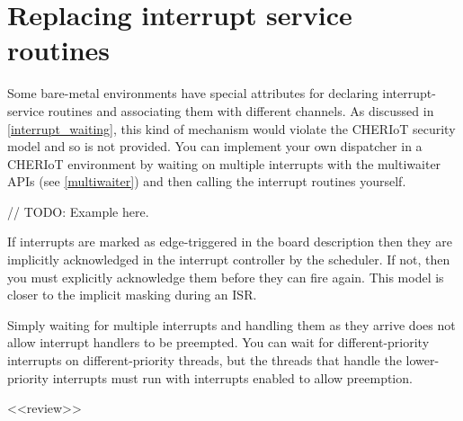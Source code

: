 \section{Replacing interrupt service routines}

Some bare-metal environments have special attributes for declaring interrupt-service routines and associating them with different channels.
As discussed in \ref{interrupt_waiting}, this kind of mechanism would violate the CHERIoT security model and so is not provided.
You can implement your own dispatcher in a CHERIoT environment by waiting on multiple interrupts with the multiwaiter APIs (see \ref{multiwaiter}) and then calling the interrupt routines yourself.

// TODO: Example here.

If interrupts are marked as edge-triggered in the board description then they are implicitly acknowledged in the interrupt controller by the scheduler.
If not, then you must explicitly acknowledge them before they can fire again.
This model is closer to the implicit masking during an ISR.

\begin{caution}
Simply waiting for multiple interrupts and handling them as they arrive does not allow interrupt handlers to be preempted.
You can wait for different-priority interrupts on different-priority threads, but the threads that handle the lower-priority interrupts must run with interrupts enabled to allow preemption.
\end{caution}
<<review>>
